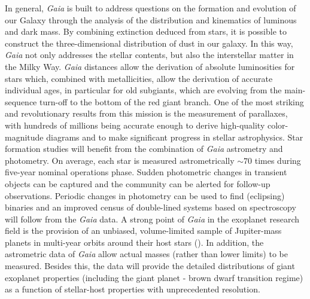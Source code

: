 In general, \textit{Gaia} is built to address questions on the formation and evolution of our Galaxy through the analysis of the distribution and kinematics of luminous and dark mass. By combining extinction deduced from stars, it is possible to construct the three-dimensional distribution of dust in our galaxy. In this way, \textit{Gaia} not only addresses the stellar contents, but also the interstellar matter in the Milky Way. \textit{Gaia} distances allow the derivation of absolute luminosities for stars which, combined with metallicities, allow the derivation of accurate individual ages, in particular for old subgiants, which are evolving from the main-sequence turn-off to the bottom of the red giant branch. One of the most striking and revolutionary results from this mission is the measurement of parallaxes, with hundreds of millions being accurate enough to derive high-quality color-magnitude diagrams and to make significant progress in stellar astrophysics. Star formation studies will benefit from the combination of \textit{Gaia} astrometry and photometry. On average, each star is measured astrometrically $\sim70$ times during five-year nominal operations phase. Sudden photometric changes in transient objects can be captured and the community can be alerted for follow-up observations. Periodic changes in photometry can be used to find (eclipsing) binaries and an improved census of double-lined systems based on spectroscopy will follow from the \textit{Gaia} data. A strong point of \textit{Gaia} in the exoplanet research field is the provision of an unbiased, volume-limited sample of Jupiter-mass planets in multi-year orbits around their host stars  (\citeyear{2014ApJ...797...14P}). In addition, the astrometric data of \textit{Gaia} allow actual masses (rather than lower limits) to be measured. Besides this, the data will provide the detailed distributions of giant exoplanet properties (including the giant planet - brown dwarf transition regime) as a function of stellar-host properties with unprecedented resolution. %


